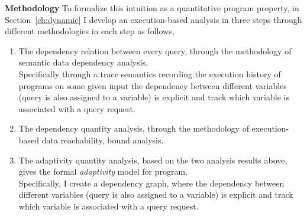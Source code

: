 \begin{itemize}
\textbf{Methodology}
To formalize this intuition as a quantitative program property, 
in Section~\ref{ch:dynamic} I develop an execution-based analysis
 in three steps through different methodologies in each step as follows,
 \begin{enumerate}
 \item The dependency relation between every query, through the methodology of semantic data dependency analysis.
 \\
 Specifically through a trace semantics recording the execution history of programs on some given input
 the dependency between different variables (query is also assigned to a variable) is explicit and track which variable is associated with a query request. 
 \item The dependency quantity analysis, through the methodology of execution-based data reachability, bound analysis.
 \item The adaptivity quantity analysis, based on the two analysis results above, gives the formal \emph{adaptivity} model 
 for program.
 \\
 Specifically, I create a dependency graph, where the dependency between different variables (query is also assigned to a variable) is explicit and track which variable is associated with a query request. 

\end{enumerate}
\end{itemize}
